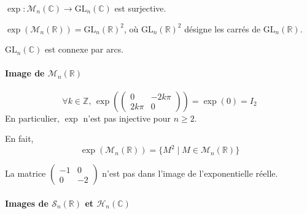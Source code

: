   \begin{theorem}
    $\exp : \mathcal{M}_n(\mathbb{C}) \rightarrow \mathrm{GL}_n(\mathbb{C})$ est surjective.
  \end{theorem}

  \begin{application}
    $\exp(\mathcal{M}_n(\mathbb{R})) = \mathrm{GL}_n(\mathbb{R})^2$, où $\mathrm{GL}_n(\mathbb{R})^2$ désigne les carrés de $\mathrm{GL}_n(\mathbb{R})$.
  \end{application}


  \begin{application}
    $\mathrm{GL}_n(\mathbb{C})$ est connexe par arcs.
  \end{application}

  \paragraph{Image de \texorpdfstring{$\mathcal{M}_n(\mathbb{R})$}{Mₙ(R)}}


  \begin{example}
    \[ \forall k \in \mathbb{Z}, \, \exp \left( \begin{pmatrix} 0 & -2k\pi \\ 2k\pi & 0 \end{pmatrix} \right) = \exp(0) = I_2 \]
    En particulier, $\exp$ n'est pas injective pour $n \geq 2$.
  \end{example}

  \begin{proposition}
    En fait,
    \[ \exp(\mathcal{M}_n(\mathbb{R})) = \{ M^2 \mid M \in \mathcal{M}_n(\mathbb{R}) \} \]
  \end{proposition}

  \begin{example}
    La matrice $\begin{pmatrix} -1 & 0 \\ 0 & -2 \end{pmatrix}$ n'est pas dans l'image de l'exponentielle réelle.
  \end{example}

  \paragraph{Images de $\mathcal{S}_n(\mathbb{R})$ et $\mathcal{H}_n(\mathbb{C})$}


